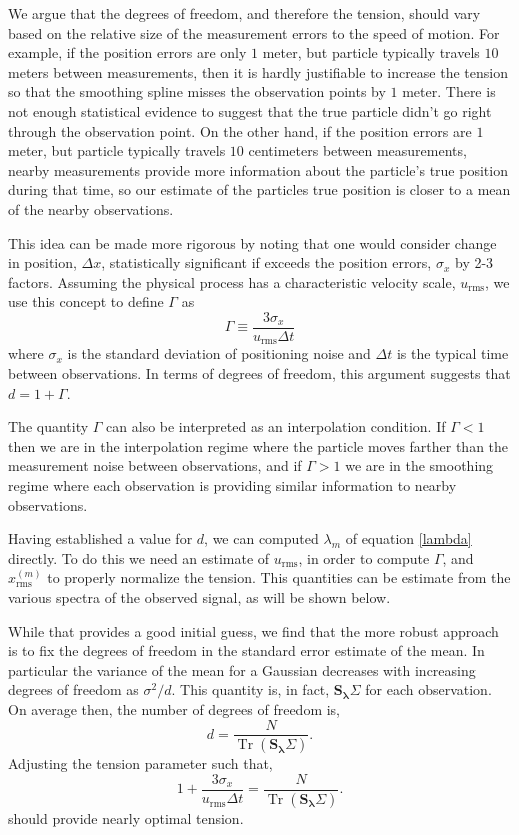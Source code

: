 \documentclass[twocol]{ametsoc}
\DeclareMathOperator{\Tr}{Tr}
\begin{document}
We argue that the degrees of freedom, and therefore the tension, should vary based on the relative size of the measurement errors to the speed of motion. For example, if the position errors are only $1$ meter, but particle typically travels $10$ meters between measurements, then it is hardly justifiable to increase the tension so that the smoothing spline misses the observation points by $1$ meter. There is not enough statistical evidence to suggest that the true particle didn't go right through the observation point. On the other hand, if the position errors are  $1$ meter, but particle typically travels $10$ centimeters between measurements, nearby measurements provide more information about the particle's true position during that time, so our estimate of the particles true position is closer to a mean of the nearby observations.

This idea can be made more rigorous by noting that one would consider change in position, $\Delta x$, statistically significant if exceeds the position errors, $\sigma_x$ by 2-3 factors. Assuming the physical process has a characteristic velocity scale, $u_{\textrm{rms}}$, we use this concept to define $\Gamma$ as
\begin{equation}
\label{gamma_equation}
\Gamma \equiv \frac{3 \sigma_x}{u_{\textrm{rms}}\Delta t}
\end{equation}
where $\sigma_x$ is the standard deviation of positioning noise and $\Delta t$ is the typical time between observations. In terms of degrees of freedom, this argument suggests that $d = 1 + \Gamma$.

The quantity $\Gamma$ can also be interpreted as an interpolation condition. If $\Gamma<1$ then we are in the interpolation regime where the particle moves farther than the measurement noise between observations, and if $\Gamma >1$ we are in the smoothing regime where each observation is providing similar information to nearby observations.

Having established a value for $d$, we can computed $\lambda_m$ of equation \ref{lambda} directly. To do this we need an estimate of $u_{\textrm{rms}}$, in order to compute $\Gamma$, and $x^{(m)}_{\textrm{rms}}$ to properly normalize the tension. This quantities can be estimate from the various spectra of the observed signal, as will be shown below.

While that provides a good initial guess, we find that the more robust approach is to fix the degrees of freedom in the standard error estimate of the mean. In particular the variance of the mean for a Gaussian decreases with increasing degrees of freedom as $\sigma^2/d$. This quantity is, in fact, $\mathbf{S_\lambda} \Sigma$ for each observation. On average then, the number of degrees of freedom is,
\begin{equation}
d = \frac{N}{\Tr \left(\mathbf{S_\lambda} \Sigma \right) }.
\end{equation}
Adjusting the tension parameter such that,
\begin{equation}
\label{iterated_tension}
1 + \frac{3 \sigma_x}{u_{\textrm{rms}}\Delta t} = \frac{N}{\Tr \left(\mathbf{S_\lambda} \Sigma \right) }.
\end{equation}
should provide nearly optimal tension.
\end{document}
